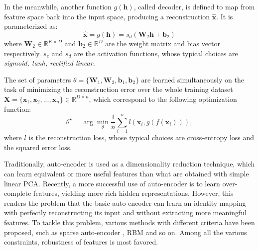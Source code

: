 \documentclass{article}
\def \bb{\mathbf b}
\def \x{\mathbf x}
\def \h{\mathbf h}
\def \W{\mathbf W}
\def \X{\mathbf X}
\begin{document}
In the meanwhile, another function $g(\h)$, called decoder, is defined to map from feature space back into the input space, producing a reconstruction $\hat{\x}$. It is parameterized as:
\begin{equation}
     \hat{\x}= g(\h) = s_d(\W_2 \h + \bb_2)
     \label{eq:decoder}
\end{equation}
where $\W_2 \in \mathbb{R}^{K \times D}$  and $\bb_2 \in \mathbb{R}^D$ are the weight matrix and bias vector respectively. $s_e$ and $s_d$ are the activation functions, whose typical choices are \emph{sigmoid, tanh, rectified linear.}

The set of parameters $\theta = \{\W_1, \W_2, \bb_1, \bb_2\}$ are learned simultaneously on the task of minimizing the reconstruction error over the whole training dataset $\X = \{\x_1, \x_2, ..., \x_n\} \in \mathbb{R}^{D \times n }$, which correspond to the following optimization function:
\begin{equation}
  \theta^{\star} = \arg\min_{\theta} \frac{1}{n}\sum_{i = 1}^n  l(\x_i, g(f(\x_i))),
 \label{eq:obj_ae}
\end{equation}
where $l$ is the reconstruction loss, whose typical choices are cross-entropy loss  and the squared error loss.

Traditionally, auto-encoder is used as a dimensionality reduction technique, which can learn equivalent or more useful features than what are obtained with simple linear PCA. Recently, a more successful use of auto-encoder is to learn over-complete features, yielding more rich hidden representations. However, this renders the problem that the basic auto-encoder can learn an identity mapping with perfectly reconstructing its input and without extracting more meaningful features. To tackle this problem, various methods with different criteria have been proposed, such as sparse auto-encoder \cite{ngiam2011optimization}, RBM \cite{hinton2006fast} and so on. Among all the various constraints, robustness of features is most favored.
\end{document}
